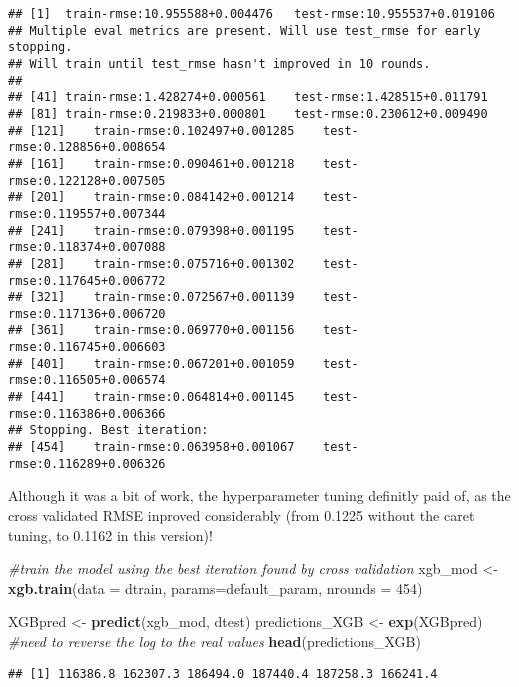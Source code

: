 \documentclass[]{article}
\newenvironment{Shaded}{\begin{snugshade}}{\end{snugshade}}
\newcommand{\CommentTok}[1]{\textcolor[rgb]{0.56,0.35,0.01}{\textit{#1}}}
\newcommand{\DataTypeTok}[1]{\textcolor[rgb]{0.13,0.29,0.53}{#1}}
\newcommand{\DecValTok}[1]{\textcolor[rgb]{0.00,0.00,0.81}{#1}}
\newcommand{\KeywordTok}[1]{\textcolor[rgb]{0.13,0.29,0.53}{\textbf{#1}}}
\newcommand{\NormalTok}[1]{#1}
\newcommand{\StringTok}[1]{\textcolor[rgb]{0.31,0.60,0.02}{#1}}
\begin{document}
\begin{verbatim}
## [1]  train-rmse:10.955588+0.004476   test-rmse:10.955537+0.019106 
## Multiple eval metrics are present. Will use test_rmse for early stopping.
## Will train until test_rmse hasn't improved in 10 rounds.
## 
## [41] train-rmse:1.428274+0.000561    test-rmse:1.428515+0.011791 
## [81] train-rmse:0.219833+0.000801    test-rmse:0.230612+0.009490 
## [121]    train-rmse:0.102497+0.001285    test-rmse:0.128856+0.008654 
## [161]    train-rmse:0.090461+0.001218    test-rmse:0.122128+0.007505 
## [201]    train-rmse:0.084142+0.001214    test-rmse:0.119557+0.007344 
## [241]    train-rmse:0.079398+0.001195    test-rmse:0.118374+0.007088 
## [281]    train-rmse:0.075716+0.001302    test-rmse:0.117645+0.006772 
## [321]    train-rmse:0.072567+0.001139    test-rmse:0.117136+0.006720 
## [361]    train-rmse:0.069770+0.001156    test-rmse:0.116745+0.006603 
## [401]    train-rmse:0.067201+0.001059    test-rmse:0.116505+0.006574 
## [441]    train-rmse:0.064814+0.001145    test-rmse:0.116386+0.006366 
## Stopping. Best iteration:
## [454]    train-rmse:0.063958+0.001067    test-rmse:0.116289+0.006326
\end{verbatim}

Although it was a bit of work, the hyperparameter tuning definitly paid
of, as the cross validated RMSE inproved considerably (from 0.1225
without the caret tuning, to 0.1162 in this version)!

\begin{Shaded}
\begin{Highlighting}[]
\CommentTok{#train the model using the best iteration found by cross validation}
\NormalTok{xgb_mod <-}\StringTok{ }\KeywordTok{xgb.train}\NormalTok{(}\DataTypeTok{data =}\NormalTok{ dtrain, }\DataTypeTok{params=}\NormalTok{default_param, }\DataTypeTok{nrounds =} \DecValTok{454}\NormalTok{)}
\end{Highlighting}
\end{Shaded}

\begin{Shaded}
\begin{Highlighting}[]
\NormalTok{XGBpred <-}\StringTok{ }\KeywordTok{predict}\NormalTok{(xgb_mod, dtest)}
\NormalTok{predictions_XGB <-}\StringTok{ }\KeywordTok{exp}\NormalTok{(XGBpred) }\CommentTok{#need to reverse the log to the real values}
\KeywordTok{head}\NormalTok{(predictions_XGB)}
\end{Highlighting}
\end{Shaded}

\begin{verbatim}
## [1] 116386.8 162307.3 186494.0 187440.4 187258.3 166241.4
\end{verbatim}
\end{document}
